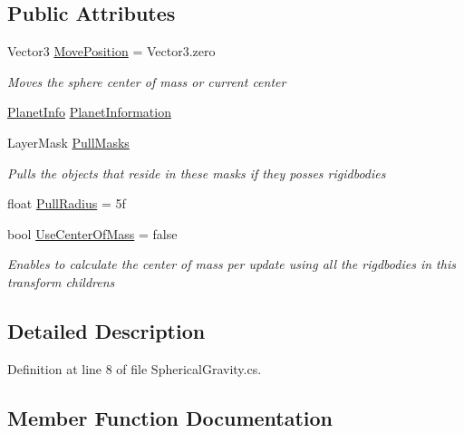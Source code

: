 \subsection*{Public Attributes}
\begin{DoxyCompactItemize}
\item 
Vector3 \hyperlink{class_g_t_core_1_1_enviroment_1_1_spherical_gravity_a1a0fdb0db303337b9ec58ca8a1ab512f}{Move\+Position} = Vector3.\+zero
\begin{DoxyCompactList}\small\item\em Moves the sphere center of mass or current center \end{DoxyCompactList}\item 
\hyperlink{class_g_t_core_1_1_enviroment_1_1_planet_info}{Planet\+Info} \hyperlink{class_g_t_core_1_1_enviroment_1_1_spherical_gravity_a1c82b6d71183bcaa8960cc83fb25912c}{Planet\+Information}
\item 
Layer\+Mask \hyperlink{class_g_t_core_1_1_enviroment_1_1_spherical_gravity_adc8b38ae5977a128be64af2f272f225c}{Pull\+Masks}
\begin{DoxyCompactList}\small\item\em Pulls the objects that reside in these masks if they posses rigidbodies \end{DoxyCompactList}\item 
float \hyperlink{class_g_t_core_1_1_enviroment_1_1_spherical_gravity_a503f1cdc6032d4bd7393fbed67af90b8}{Pull\+Radius} = 5f
\item 
bool \hyperlink{class_g_t_core_1_1_enviroment_1_1_spherical_gravity_ae3cb893e14719fe01d597926da52ab9e}{Use\+Center\+Of\+Mass} = false
\begin{DoxyCompactList}\small\item\em Enables to calculate the center of mass per update using all the rigdbodies in this transform childrens \end{DoxyCompactList}\end{DoxyCompactItemize}


\subsection{Detailed Description}


Definition at line 8 of file Spherical\+Gravity.\+cs.



\subsection{Member Function Documentation}
\hypertarget{class_g_t_core_1_1_enviroment_1_1_spherical_gravity_a4eb4a5a2cd4dff163e5ab18b787fa5a2}{}
